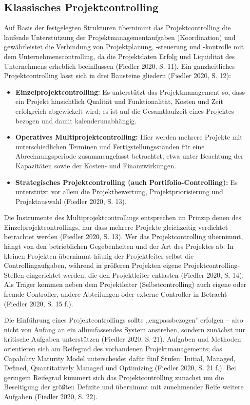 \documentclass[
    12pt, 
    a4paper,
    ]{scrartcl} %
\begin{document}
\subsection{Klassisches Projektcontrolling}
Auf Basis der festgelegten Strukturen übernimmt das Projektcontrolling die laufende Unterstützung der Projektmanagementaufgaben (Koordination) und gewährleistet die Verbindung von Projektplanung, -steuerung und -kontrolle mit dem Unternehmenscontrolling, da die Projektdaten Erfolg und Liquidität des Unternehmens erheblich beeinflussen (Fiedler 2020, S. 11).
Ein ganzheitliches Projektcontrolling lässt sich in drei Bausteine gliedern (Fiedler 2020, S. 12):
\begin{itemize}
    \setlength\itemsep{0.4\baselineskip}
    \setlength\parskip{0pt}
    \setlength\parsep{0pt}
    \item \textbf{Einzelprojektcontrolling:} Es unterstützt das Projektmanagement so, dass ein Projekt hinsichtlich Qualität und Funktionalität, Kosten und Zeit erfolgreich abgewickelt wird; es ist auf die Gesamtlaufzeit eines Projektes bezogen und damit kalenderunabhängig.
    \item \textbf{Operatives Multiprojektcontrolling:} Hier werden mehrere Projekte mit unterschiedlichen Terminen und Fertigstellungsständen für eine Abrechnungsperiode zusammengefasst betrachtet, etwa unter Beachtung der Kapazitäten sowie der Kosten- und Finanzwirkungen.
    \item \textbf{Strategisches Projektcontrolling (auch Portifolio-Controlling):} Es unterstützt vor allem die Projektbewertung, Projektpriorisierung und Projektauswahl (Fiedler 2020, S. 13).
  \end{itemize}
Die Instrumente des Multiprojektcontrollings entsprechen im Prinzip denen des Einzelprojektcontrollings, nur dass mehrere Projekte gleichzeitig verdichtet betrachtet werden (Fiedler 2020, S. 13). Wer das Projektcontrolling übernimmt, hängt von den betrieblichen Gegebenheiten und der Art des Projektes ab: In kleinen Projekten übernimmt häufig der Projektleiter selbst die Controllingaufgaben, während in größeren Projekten eigene Projektcontrolling-Stellen eingerichtet werden, die den Projektleiter entlasten (Fiedler 2020, S. 14). Als Träger kommen neben dem Projektleiter (Selbstcontrolling) auch eigene oder fremde Controller, andere Abteilungen oder externe Controller in Betracht (Fiedler 2020, S. 15 f.).

Die Einführung eines Projektcontrollings sollte „engpassbezogen" erfolgen – also nicht von Anfang an ein allumfassendes System anstreben, sondern zunächst nur kritische Aufgaben unterstützen (Fiedler 2020, S. 21). Aufgaben und Methoden orientieren sich am Reifegrad des vorhandenen Projektmanagements; das Capability Maturity Model unterscheidet dafür fünf Stufen: Initial, Managed, Defined, Quantitatively Managed und Optimizing (Fiedler 2020, S. 21 f.). Bei geringem Reifegrad kümmert sich das Projektcontrolling zunächst um die Beseitigung der größten Defizite und übernimmt mit zunehmender Reife weitere Aufgaben (Fiedler 2020, S. 22).
\end{document}
